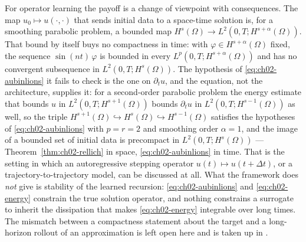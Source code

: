 For operator learning the payoff is a change of viewpoint with consequences. The map $u_0 \mapsto u(\cdot,\cdot)$ that sends initial data to a space-time solution is, for a smoothing parabolic problem, a bounded map $H^s(\Omega) \to L^2(0,T;H^{s+\alpha}(\Omega))$. That bound by itself buys no compactness in time: with $\varphi \in H^{s+\alpha}(\Omega)$ fixed, the sequence $\sin(nt)\,\varphi$ is bounded in every $L^p(0,T;H^{s+\alpha}(\Omega))$ and has no convergent subsequence in $L^2(0,T;H^s(\Omega))$. The hypothesis of \eqref{eq:ch02-aubinlions} it fails to check is the one on $\partial_t u$, and the equation, not the architecture, supplies it: for a second-order parabolic problem the energy estimate that bounds $u$ in $L^2(0,T;H^{s+1}(\Omega))$ bounds $\partial_t u$ in $L^2(0,T;H^{s-1}(\Omega))$ as well, so the triple $H^{s+1}(\Omega) \hookrightarrow H^{s}(\Omega) \hookrightarrow H^{s-1}(\Omega)$ satisfies the hypotheses of \eqref{eq:ch02-aubinlions} with $p = r = 2$ and smoothing order $\alpha = 1$, and the image of a bounded set of initial data is precompact in $L^2(0,T;H^s(\Omega))$ --- Theorem~\ref{thm:ch02-rellich} in space, \eqref{eq:ch02-aubinlions} in time. That is the setting in which an autoregressive stepping operator $u(t) \mapsto u(t+\Delta t)$, or a trajectory-to-trajectory model, can be discussed at all. What the framework does \emph{not} give is stability of the learned recursion: \eqref{eq:ch02-aubinlions} and \eqref{eq:ch02-energy} constrain the true solution operator, and nothing constrains a surrogate to inherit the dissipation that makes \eqref{eq:ch02-energy} integrable over long times. The mismatch between a compactness statement about the target and a long-horizon rollout of an approximation is left open here and is taken up in . 

